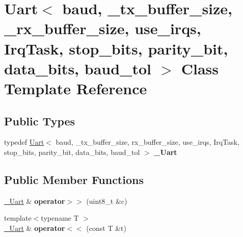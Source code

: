 \hypertarget{classUart}{}\section{Uart$<$ baud, \+\_\+tx\+\_\+buffer\+\_\+size, \+\_\+rx\+\_\+buffer\+\_\+size, use\+\_\+irqs, Irq\+Task, stop\+\_\+bits, parity\+\_\+bit, data\+\_\+bits, baud\+\_\+tol $>$ Class Template Reference}
\label{classUart}
\subsection*{Public Types}
\begin{DoxyCompactItemize}
\item 
\hypertarget{classUart_a6a4ba865a0631578cdeb39a73672db7a}{}\label{classUart_a6a4ba865a0631578cdeb39a73672db7a} 
typedef \hyperlink{classUart}{Uart}$<$ baud, \+\_\+tx\+\_\+buffer\+\_\+size, rx\+\_\+buffer\+\_\+size, use\+\_\+irqs, Irq\+Task, stop\+\_\+bits, parity\+\_\+bit, data\+\_\+bits, baud\+\_\+tol $>$ {\bfseries \+\_\+\+Uart}
\end{DoxyCompactItemize}
\subsection*{Public Member Functions}
\begin{DoxyCompactItemize}
\item 
\hypertarget{classUart_afc331ecc0055d7a548f8c3287fa7dd42}{}\label{classUart_afc331ecc0055d7a548f8c3287fa7dd42} 
\hyperlink{classUart}{\+\_\+\+Uart} \& {\bfseries operator$>$$>$} (uint8\+\_\+t \&c)
\item 
\hypertarget{classUart_a9c37572450828368197a6f3b9e105d37}{}\label{classUart_a9c37572450828368197a6f3b9e105d37} 
{\footnotesize template$<$typename T $>$ }\\\hyperlink{classUart}{\+\_\+\+Uart} \& {\bfseries operator$<$$<$} (const T \&t)
\end{DoxyCompactItemize}

